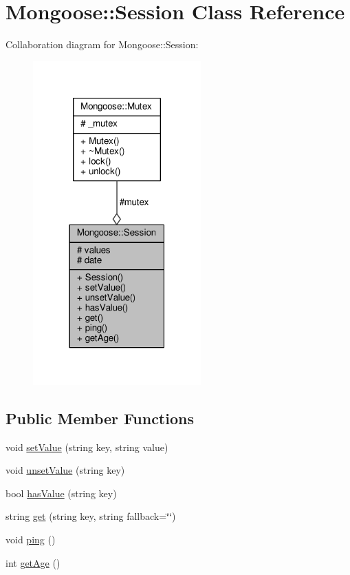 \hypertarget{classMongoose_1_1Session}{}\section{Mongoose\+:\+:Session Class Reference}
\label{classMongoose_1_1Session}


Collaboration diagram for Mongoose\+:\+:Session\+:
\nopagebreak
\begin{figure}[H]
\begin{center}
\leavevmode
\includegraphics[width=183pt]{d0/ddb/classMongoose_1_1Session__coll__graph}
\end{center}
\end{figure}
\subsection*{Public Member Functions}
\begin{DoxyCompactItemize}
\item 
void \hyperlink{classMongoose_1_1Session_a8895fb19ca9754f222f62b0de3795b8b}{set\+Value} (string key, string value)
\item 
void \hyperlink{classMongoose_1_1Session_a7094ce378bcfc1cee792cca153ce8194}{unset\+Value} (string key)
\item 
bool \hyperlink{classMongoose_1_1Session_ab9d9545167cc932ed2019d16bf0831b8}{has\+Value} (string key)
\item 
string \hyperlink{classMongoose_1_1Session_a28817383258d6b0d4118f0cb526dfe9f}{get} (string key, string fallback=\char`\"{}\char`\"{})
\item 
void \hyperlink{classMongoose_1_1Session_a2bf93d03779889d302f5d60812ac81ed}{ping} ()
\item 
int \hyperlink{classMongoose_1_1Session_ace15427340f011d426f56de270c02b7c}{get\+Age} ()
\end{DoxyCompactItemize}
